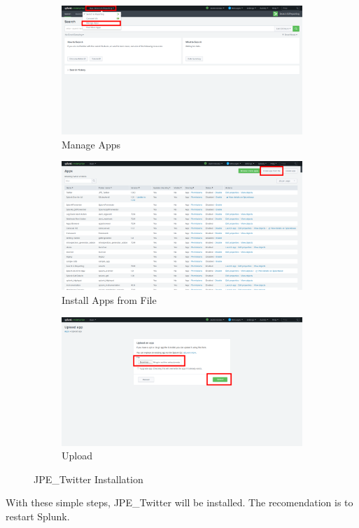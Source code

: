 \documentclass[report]{article}
\begin{document}
\begin{figure}[h!]
  \centering
  \begin{subfigure}[b]{0.49\linewidth}
    \includegraphics[width=\linewidth]{img/a.png}
     \caption{\color{text} Manage Apps}
  \end{subfigure}
  \begin{subfigure}[b]{0.49\linewidth}
    \includegraphics[width=\linewidth]{img/b.png}
    \caption{\color{text} Install Apps from File}
  \end{subfigure}
  \begin{subfigure}[b]{0.49\linewidth}
    \includegraphics[width=\linewidth]{img/c.png}
    \caption{\color{text} Upload}
  \end{subfigure}
  \caption{\color{text}JPE\_Twitter Installation}
  \label{fig:instalacion}
\end{figure}
With these simple steps, JPE\_Twitter will be installed. The recomendation is to restart Splunk.
\newpage
\end{document}
